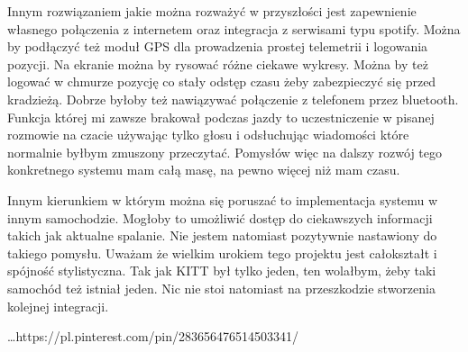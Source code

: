 \documentclass[declaration,shortabstract, inz]{iithesis}
\begin{document}
    Innym rozwiązaniem jakie można rozważyć w przyszłości jest zapewnienie własnego połączenia z internetem oraz integracja z serwisami typu spotify. Można by podłączyć też moduł GPS dla prowadzenia prostej telemetrii i logowania pozycji. Na ekranie można by rysować różne ciekawe wykresy. Można by też logować w chmurze pozycję co stały odstęp czasu żeby zabezpieczyć się przed kradzieżą. Dobrze byłoby też nawiązywać połączenie z telefonem przez bluetooth. Funkcja której mi zawsze brakował podczas jazdy to uczestniczenie w pisanej rozmowie na czacie używając tylko głosu i odsłuchując wiadomości które normalnie byłbym zmuszony przeczytać. Pomysłów więc na dalszy rozwój tego konkretnego systemu mam całą masę, na pewno więcej niż mam czasu.
    
    Innym kierunkiem w którym można się poruszać to implementacja systemu w innym samochodzie. Mogłoby to umożliwić dostęp do ciekawszych informacji takich jak aktualne spalanie. Nie jestem natomiast pozytywnie nastawiony do takiego pomysłu. Uważam że wielkim urokiem tego projektu jest całokształt i spójność stylistyczna. Tak jak KITT był tylko jeden, ten wolałbym, żeby taki samochód też istniał jeden. Nic nie stoi natomiast na przeszkodzie stworzenia kolejnej integracji.


\begin{thebibliography}{1}
 \ldots https://pl.pinterest.com/pin/283656476514503341/
\end{thebibliography}
\end{document}
